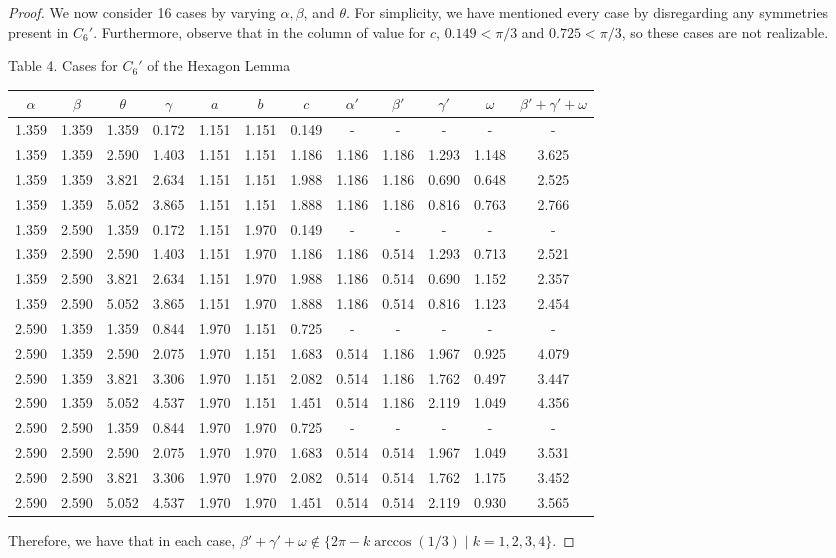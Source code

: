 \documentclass[10pt]{article}
\numberwithin{Subcase}{Case}
\begin{document}
\begin{proof}
We now consider 16 cases by varying $\alpha, \beta$, and $\theta$. For simplicity, we have mentioned every case by disregarding any symmetries present in $C_6'$. Furthermore, observe that in the column of value for $c$, $0.149< \pi/3$ and $0.725<\pi/3$, so these cases are not realizable.
\begin{center}
Table 4. Cases for $C_6'$ of the Hexagon Lemma
\begin{tabular}{| c | c | c | c | c | c | c | c | c | c | c | c |} 
\hline
$\alpha$ & $\beta$ & $\theta$ & $\gamma$ & $a$ & $b$ & $c$ & $\alpha'$ & $\beta'$ & $\gamma'$ & $\omega$ & $\beta' + \gamma' + \omega$ \\ \hline
1.359 & 1.359 & 1.359 & 0.172 & 1.151 & 1.151 & 0.149 & - & - & - & - & - \\ \hline
1.359 & 1.359 & 2.590 & 1.403 & 1.151 & 1.151 & 1.186 & 1.186 & 1.186 & 1.293 & 1.148 & 3.625 \\ \hline
1.359 & 1.359 & 3.821 & 2.634 & 1.151 & 1.151 & 1.988 & 1.186 & 1.186 & 0.690 & 0.648 & 2.525 \\ \hline
1.359 & 1.359 & 5.052 & 3.865 & 1.151 & 1.151 & 1.888 & 1.186 & 1.186 & 0.816 & 0.763 & 2.766 \\ \hline
1.359 & 2.590 & 1.359 & 0.172 & 1.151 & 1.970 & 0.149 & - & - & - & - & - \\ \hline
1.359 & 2.590 & 2.590 & 1.403 & 1.151 & 1.970 & 1.186 & 1.186 & 0.514 & 1.293 & 0.713 & 2.521 \\ \hline
1.359 & 2.590 & 3.821 & 2.634 & 1.151 & 1.970 & 1.988 & 1.186 & 0.514 & 0.690 & 1.152 & 2.357 \\ \hline
1.359 & 2.590 & 5.052 & 3.865 & 1.151 & 1.970 & 1.888 & 1.186 & 0.514 & 0.816 & 1.123 & 2.454 \\ \hline
2.590 & 1.359 & 1.359 & 0.844 & 1.970 & 1.151 & 0.725 & - & - & - & - & - \\ \hline
2.590 & 1.359 & 2.590 & 2.075 & 1.970 & 1.151 & 1.683 & 0.514 & 1.186 & 1.967 & 0.925 & 4.079 \\ \hline
2.590 & 1.359 & 3.821 & 3.306 & 1.970 & 1.151 & 2.082 & 0.514 & 1.186 & 1.762 & 0.497 & 3.447 \\ \hline
2.590 & 1.359 & 5.052 & 4.537 & 1.970 & 1.151 & 1.451 & 0.514 & 1.186 & 2.119 & 1.049 & 4.356 \\ \hline
2.590 & 2.590 & 1.359 & 0.844 & 1.970 & 1.970 & 0.725 & - & - & - & - & - \\ \hline
2.590 & 2.590 & 2.590 & 2.075 & 1.970 & 1.970 & 1.683 & 0.514 & 0.514 & 1.967 & 1.049 & 3.531 \\ \hline
2.590 & 2.590 & 3.821 & 3.306 & 1.970 & 1.970 & 2.082 & 0.514 & 0.514 & 1.762 & 1.175 & 3.452 \\ \hline
2.590 & 2.590 & 5.052 & 4.537 & 1.970 & 1.970 & 1.451 & 0.514 & 0.514 & 2.119 & 0.930 & 3.565 \\ \hline
\end{tabular}
\end{center}
Therefore, we have that in each case,
$\beta' + \gamma' + \omega \notin \{2\pi - k\arccos(1/3) \; | \; k=1,2,3,4\}$.


\end{proof}
\end{document}
